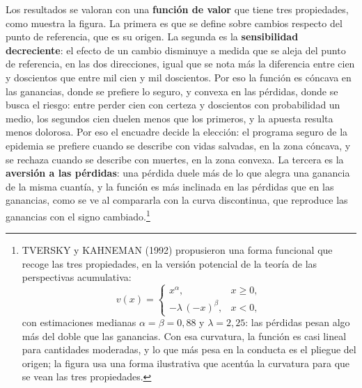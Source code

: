 \documentclass[10pt,a4paper]{article}
\begin{document}
Los resultados se valoran con una \textbf{función de valor} que tiene tres propiedades, como muestra la figura. La primera es que se define sobre cambios respecto del punto de referencia, que es su origen. La segunda es la \textbf{sensibilidad decreciente}: el efecto de un cambio disminuye a medida que se aleja del punto de referencia, en las dos direcciones, igual que se nota más la diferencia entre cien y doscientos que entre mil cien y mil doscientos. Por eso la función es cóncava en las ganancias, donde se prefiere lo seguro, y convexa en las pérdidas, donde se busca el riesgo: entre perder cien con certeza y doscientos con probabilidad un medio, los segundos cien duelen menos que los primeros, y la apuesta resulta menos dolorosa. Por eso el encuadre decide la elección: el programa seguro de la epidemia se prefiere cuando se describe con vidas salvadas, en la zona cóncava, y se rechaza cuando se describe con muertes, en la zona convexa. La tercera es la \textbf{aversión a las pérdidas}: una pérdida duele más de lo que alegra una ganancia de la misma cuantía, y la función es más inclinada en las pérdidas que en las ganancias, como se ve al compararla con la curva discontinua, que reproduce las ganancias con el signo cambiado.\footnote{%
  TVERSKY y KAHNEMAN (1992) propusieron una forma funcional que recoge las tres propiedades, en la versión potencial de la teoría de las perspectivas acumulativa:
  $$v(x)=\begin{cases}x^{\alpha}, & x\geq0,\\ -\lambda\,(-x)^{\beta}, & x<0,\end{cases}$$
  con estimaciones medianas $\alpha=\beta=0{,}88$ y $\lambda=2{,}25$: las pérdidas pesan algo más del doble que las ganancias. Con esa curvatura, la función es casi lineal para cantidades moderadas, y lo que más pesa en la conducta es el pliegue del origen; la figura usa una forma ilustrativa que acentúa la curvatura para que se vean las tres propiedades.
}
\end{document}

